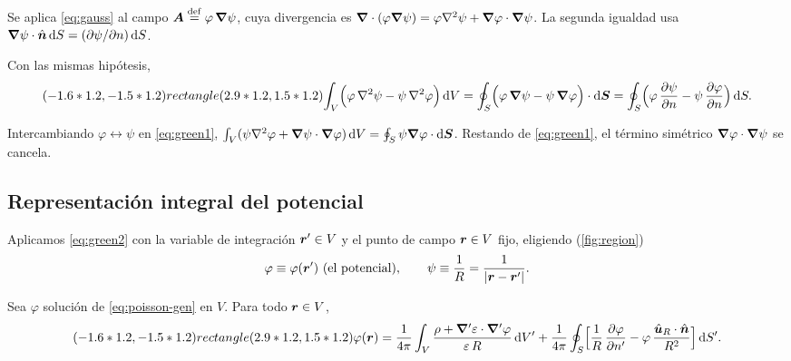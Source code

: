 \documentclass[11pt,a4paper,twoside]{article}
\begin{document}
\begin{demostracion}
Se aplica \eqref{eq:gauss} al campo $\bm{A}\mathrel{\overset{\mathrm{def}}{=}}\varphi\,\bm{\nabla}\psi$, cuya divergencia es
$\bm{\nabla}\cdot(\varphi\bm{\nabla}\psi)=\varphi\nabla^{2}\psi+\bm{\nabla}\varphi\cdot\bm{\nabla}\psi$. La segunda
igualdad usa $\bm{\nabla}\psi\cdot\hat{\bm{n}}\,\mathrm{d} S=(\partial\psi/\partial n)\,\mathrm{d} S$.
\end{demostracion}

\begin{teorema}\label{teo:green2}
Con las mismas hipótesis,
\begin{equation}\label{eq:green2}
  (-1.6*1.2,-1.5*1.2) rectangle (2.9*1.2,1.5*1.2){\int_{V}\Bigl(\varphi\,\nabla^{2}\psi-\psi\,\nabla^{2}\varphi\Bigr)\,\mathrm{d} V
  =\oint_{S}\Bigl(\varphi\,\bm{\nabla}\psi-\psi\,\bm{\nabla}\varphi\Bigr)\cdot\mathrm{d}\bm{S}
  =\oint_{S}\Bigl(\varphi\,\frac{\partial \psi}{\partial n}-\psi\,\frac{\partial \varphi}{\partial n}\Bigr)\,\mathrm{d} S .}
\end{equation}
\end{teorema}

\begin{demostracion}
Intercambiando $\varphi\leftrightarrow\psi$ en \eqref{eq:green1},
$\int_V(\psi\nabla^{2}\varphi+\bm{\nabla}\psi\cdot\bm{\nabla}\varphi)\,\mathrm{d} V=\oint_S\psi\bm{\nabla}\varphi\cdot\mathrm{d}\bm{S}$.
Restando de \eqref{eq:green1}, el término simétrico $\bm{\nabla}\varphi\cdot\bm{\nabla}\psi$ se cancela.
\end{demostracion}

\subsection{Representación integral del potencial}

Aplicamos \eqref{eq:green2} con la variable de integración $\bm{r}'\in V$ y el punto de campo
$\bm{r}\in V$ fijo, eligiendo (\cref{fig:region})
\begin{equation}\label{eq:eleccion}
  \varphi\equiv\varphi(\bm{r}')\ \text{(el potencial)},\qquad
  \psi\equiv\frac1R=\frac{1}{\left\lvert \bm{r}-\bm{r}'\right\rvert} .
\end{equation}

\begin{teorema}\label{teo:repr}
Sea $\varphi$ solución de \eqref{eq:poisson-gen} en $V$. Para todo $\bm{r}\in V$,
\begin{equation}\label{eq:repr}
  (-1.6*1.2,-1.5*1.2) rectangle (2.9*1.2,1.5*1.2){\varphi(\bm{r})=\frac{1}{4\pi}\int_{V}\frac{\rho+\bm{\nabla}'\varepsilon\cdot\bm{\nabla}'\varphi}{\varepsilon\,R}\,\mathrm{d} V'
  +\frac{1}{4\pi}\oint_{S}\Bigl[\frac1R\,\frac{\partial \varphi}{\partial n'}-\varphi\,\frac{\hat{\bm{u}}_{R}\cdot\hat{\bm{n}}}{R^{2}}\Bigr]\,\mathrm{d} S' .}
\end{equation}
\end{teorema}
\end{document}

